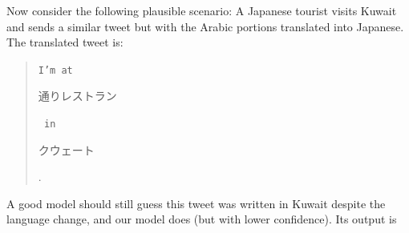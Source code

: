 \documentclass[sigconf,10pt]{acmart}
\newcommand{\str}[1]{\texttt{#1}}
\begin{document}
\begin{description}
\noindent


Now consider the following plausible scenario:
A Japanese tourist visits Kuwait and sends a similar tweet but with the Arabic portions translated into Japanese.
The translated tweet is:
\begin{quote}
\str{I'm at }\begin{CJK}{UTF8}{min}通りレストラン\end{CJK}\str{ in }\begin{CJK}{UTF8}{min}クウェート\end{CJK}.
\end{quote}
A good model should still guess this tweet was written in Kuwait despite the language change,
and our model does (but with lower confidence).
Its output is


\end{description}
\end{document}
